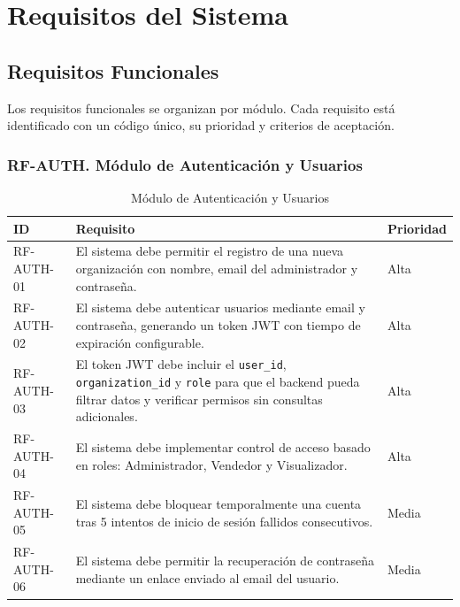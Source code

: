 \section{Requisitos del Sistema}\label{requisitos-del-sistema}

\subsection{Requisitos Funcionales}\label{requisitos-funcionales}

Los requisitos funcionales se organizan por módulo. Cada requisito está identificado con un código único, su prioridad y criterios de aceptación.

\subsubsection{RF-AUTH. Módulo de Autenticación y Usuarios}\label{rf-auth.-muxf3dulo-de-autenticaciuxf3n-y-usuarios}

\begin{longtable}[]{@{}
  >{\raggedright\arraybackslash}p{}
  >{\raggedright\arraybackslash}p{}
  >{\raggedright\arraybackslash}p{}@{}}
\caption[Módulo de Autenticación y Usuarios]{Módulo de Autenticación y Usuarios}\tabularnewline
\toprule\noalign{}
\begin{minipage}[b]{\linewidth}\raggedright
ID
\end{minipage} & \begin{minipage}[b]{\linewidth}\raggedright
Requisito
\end{minipage} & \begin{minipage}[b]{\linewidth}\raggedright
Prioridad
\end{minipage} \\
\midrule\noalign{}
\endhead
\bottomrule\noalign{}
\endlastfoot
RF-AUTH-01 & El sistema debe permitir el registro de una nueva organización con nombre, email del administrador y contraseña. & Alta \\
RF-AUTH-02 & El sistema debe autenticar usuarios mediante email y contraseña, generando un token JWT con tiempo de expiración configurable. & Alta \\
RF-AUTH-03 & El token JWT debe incluir el \texttt{user\_id}, \texttt{organization\_id} y \texttt{role} para que el backend pueda filtrar datos y verificar permisos sin consultas adicionales. & Alta \\
RF-AUTH-04 & El sistema debe implementar control de acceso basado en roles: Administrador, Vendedor y Visualizador. & Alta \\
RF-AUTH-05 & El sistema debe bloquear temporalmente una cuenta tras 5 intentos de inicio de sesión fallidos consecutivos. & Media \\
RF-AUTH-06 & El sistema debe permitir la recuperación de contraseña mediante un enlace enviado al email del usuario. & Media \\
\end{longtable}


